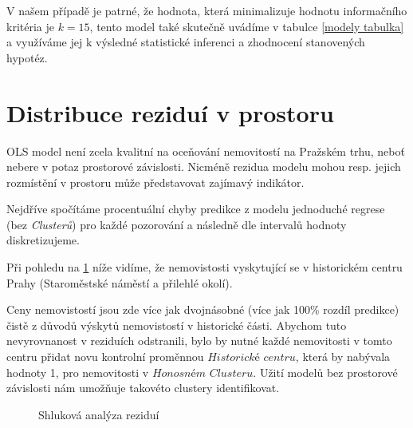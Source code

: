 \documentclass[11pt, a4paper]{article}
\begin{document}
\clearpage

V našem případě je patrné, že hodnota, která minimalizuje hodnotu informačního kritéria je \textit{$k = 15$}, tento model také skutečně uvádíme v tabulce \ref{modely tabulka} a využíváme jej k výsledné statistické inferenci a zhodnocení stanovených hypotéz.


\section{Distribuce reziduí v prostoru}

OLS model není zcela kvalitní na oceňování nemovitostí na Pražském trhu, neboť nebere v potaz prostorové závislosti. Nicméně rezidua modelu mohou resp. jejich rozmístění v prostoru může představovat zajímavý indikátor.


Nejdříve spočítáme procentuální chyby predikce z modelu jednoduché regrese (bez \textit{Clusterů}) pro každé pozorování a následně dle intervalů hodnoty diskretizujeme.

Při pohledu na \ref{Shluková analýza reziduí} níže vidíme, že nemovistosti vyskytující se v historickém centru Prahy (Staroměstské náměstí a přilehlé okolí).

Ceny nemovistostí jsou zde více jak dvojnásobné (více jak 100\% rozdíl predikce) čistě z důvodů výskytů nemovistostí v historické části. Abychom tuto nevyrovnanost v reziduích odstranili, bylo by nutné každé nemovitosti v tomto centru přidat novu kontrolní proměnnou $\textit{Historické centru}$, která by nabývala hodnoty 1, pro nemovitosti v $\textit{Honosném Clusteru}$. Užití modelů bez prostorové závislosti nám umožňuje takovéto clustery identifikovat.

\clearpage
\begin{figure}[ht]
\centering
\noindent{}
\caption{Shluková analýza reziduí}
\label{Shluková analýza reziduí}
\end{figure}
\end{document}
